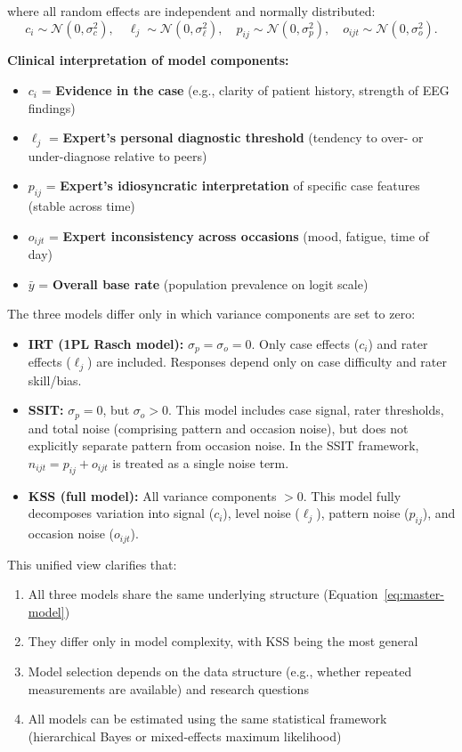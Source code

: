 \documentclass[num-refs]{wiley-article}
\begin{document}
where all random effects are independent and normally distributed:
$$c_i \sim \mathcal{N}(0,\sigma_c^2), \quad \ell_j \sim \mathcal{N}(0,\sigma_\ell^2), \quad p_{ij} \sim \mathcal{N}(0,\sigma_p^2), \quad o_{ijt} \sim \mathcal{N}(0,\sigma_o^2).$$

\textbf{Clinical interpretation of model components:}
\begin{itemize}
    \item $c_i$ = \textbf{Evidence in the case} (e.g., clarity of patient history, strength of EEG findings)
    \item $\ell_j$ = \textbf{Expert's personal diagnostic threshold} (tendency to over- or under-diagnose relative to peers)
    \item $p_{ij}$ = \textbf{Expert's idiosyncratic interpretation} of specific case features (stable across time)
    \item $o_{ijt}$ = \textbf{Expert inconsistency across occasions} (mood, fatigue, time of day)
    \item $\bar{y}$ = \textbf{Overall base rate} (population prevalence on logit scale)
\end{itemize}

The three models differ only in which variance components are set to zero:

\begin{itemize}
    \item \textbf{IRT (1PL Rasch model):} $\sigma_p = \sigma_o = 0$. Only case effects ($c_i$) and rater effects ($\ell_j$) are included. Responses depend only on case difficulty and rater skill/bias.

    \item \textbf{SSIT:} $\sigma_p = 0$, but $\sigma_o > 0$. This model includes case signal, rater thresholds, and total noise (comprising pattern and occasion noise), but does not explicitly separate pattern from occasion noise. In the SSIT framework, $n_{ijt} = p_{ij} + o_{ijt}$ is treated as a single noise term.

    \item \textbf{KSS (full model):} All variance components $> 0$. This model fully decomposes variation into signal ($c_i$), level noise ($\ell_j$), pattern noise ($p_{ij}$), and occasion noise ($o_{ijt}$).
\end{itemize}

This unified view clarifies that:
\begin{enumerate}
    \item All three models share the same underlying structure (Equation~\ref{eq:master-model})
    \item They differ only in model complexity, with KSS being the most general
    \item Model selection depends on the data structure (e.g., whether repeated measurements are available) and research questions
    \item All models can be estimated using the same statistical framework (hierarchical Bayes or mixed-effects maximum likelihood)
\end{enumerate}
\end{document}
